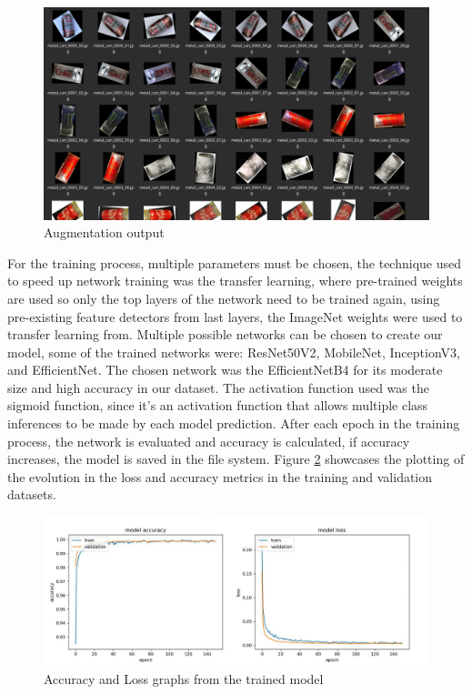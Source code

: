 \documentclass[a4paper,11pt]{article}
\begin{document}
\begin{figure}[H]
  \centering
  \includegraphics[scale=0.3]{Figures/Training directory example.png}
  \caption{\small{Augmentation output}}
  \label{fig:augmentation_example}
\end{figure}

For the training process, multiple parameters must be chosen, the technique used to speed up network training was the transfer learning, where pre-trained weights are used so only the top layers of the network need to be trained again, using pre-existing feature detectors from last layers, the ImageNet\cite{imagenet} weights were used to transfer learning from. Multiple possible networks can be chosen to create our model, some of the trained networks were: ResNet50V2, MobileNet, InceptionV3, and EfficientNet. The chosen network was the EfficientNetB4 for its moderate size and high accuracy in our dataset. The activation function used was the sigmoid function, since it’s an activation function that allows multiple class inferences to be made by each model prediction. After each epoch in the training process, the network is evaluated and accuracy is calculated, if accuracy increases, the model is saved in the file system. Figure \ref{fig:training_model} showcases the plotting of the evolution in the loss and accuracy metrics in the training and validation datasets.

\begin{figure}[H]
  \centering
  \includegraphics[width=12.5cm]{Figures/training_result.png}
  \caption{\small{Accuracy and Loss graphs from the trained model}}
  \label{fig:training_model}
\end{figure}
\end{document}
